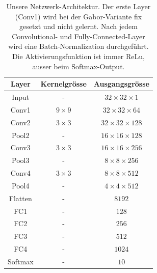 \begin{table}
	\centering
	\begin{tabular}{|c|c|c|}
		\hline
		Layer & Kernelgrösse & Ausgangsgrösse \\ 
		\hline \hline
		Input & - & $32 \times 32 \times 1$ \\ 
		\hline 
		Conv1 & $9 \times 9$ &  $32 \times 32 \times 64$\\ 
		\hline 
		Conv2 & $3 \times 3$ &  $32 \times 32 \times 128$\\  
		\hline 
		Pool2 & - &  $16 \times 16 \times 128$\\ 
		\hline 
		Conv3 & $3 \times 3$ & $16 \times 16 \times 256$\\ 
		\hline 
		Pool3 & - &  $8 \times 8 \times 256$\\ 
		\hline 
		Conv4 & $3 \times 3$ & $8 \times 8 \times 512$\\ 
		\hline 
		Pool4 & - &  $4 \times 4 \times 512$\\ 
		\hline 
		Flatten & - & $ 8192 $ \\ 
		\hline 
		FC1 & - & $ 128 $ \\ 
		\hline 
		FC2 & - & $ 256 $ \\
		\hline 
		FC3 & - & $ 512 $ \\  
		\hline 
		FC4 & - & $ 1024 $ \\ 
		\hline 
		Softmax & - & $ 10 $ \\ 
		\hline
	\end{tabular} 
	\caption{Unsere Netzwerk-Architektur. Der erste Layer (Conv1) wird bei der Gabor-Variante fix gesetzt und nicht gelernt. Nach jedem Convolutional- und Fully-Connected-Layer wird eine Batch-Normalization durchgeführt. Die Aktivierungsfunktion ist immer ReLu, ausser beim Softmax-Output.}
	\label{table:architecture}
\end{table}


